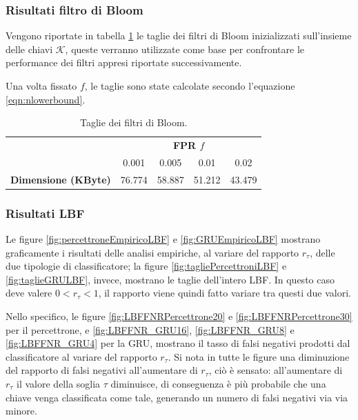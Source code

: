\documentclass[../../main.tex]{subfiles}
\begin{document}
    \subsubsection{Risultati filtro di Bloom}

    Vengono riportate in tabella \ref{tab:taglieFiltro} le taglie dei filtri di Bloom inizializzati sull'insieme delle chiavi $\mathcal{K}$, queste verranno utilizzate come base per confrontare le performance dei filtri appresi riportate successivamente.

    Una volta fissato $f$, le taglie sono state calcolate secondo l'equazione \ref{eqn:nlowerbound}.
    
    \begin{table}
        \centering
        \begin{tabular}{lcccc}
            \toprule
            {} & \multicolumn{4}{c}{\textbf{FPR $f$}}\\
            {} & 0.001 & 0.005 & 0.01 & 0.02\\
            \midrule
            \textbf{Dimensione (KByte)} & 76.774 & 58.887 & 51.212 & 43.479\\
            \bottomrule
        \end{tabular}
        \caption{Taglie dei filtri di Bloom.}
        \label{tab:taglieFiltro}
    \end{table}

    \subsubsection{Risultati LBF}
    Le figure \ref{fig:percettroneEmpiricoLBF} e \ref{fig:GRUEmpiricoLBF} mostrano graficamente i risultati delle analisi empiriche, al variare del rapporto $r_{\tau}$, delle due tipologie di classificatore; la figure \ref{fig:tagliePercettroniLBF} e \ref{fig:taglieGRULBF}, invece, mostrano le taglie dell'intero LBF. In questo caso deve valere $0 < r_{\tau} < 1$, il rapporto viene quindi fatto variare tra questi due valori.

    Nello specifico, le figure \ref{fig:LBFFNRPercettrone20} e \ref{fig:LBFFNRPercettrone30} per il percettrone, e \ref{fig:LBFFNR_GRU16}, \ref{fig:LBFFNR_GRU8} e \ref{fig:LBFFNR_GRU4} per la GRU, mostrano il tasso di falsi negativi prodotti dal classificatore al variare del rapporto $r_{\tau}$. Si nota in tutte le figure una diminuzione del rapporto di falsi negativi all'aumentare di $r_{\tau}$, ciò è sensato: all'aumentare di $r_{\tau}$ il valore della soglia $\tau$ diminuisce, di conseguenza è più probabile che una chiave venga classificata come tale, generando un numero di falsi negativi via via minore.
\end{document}
